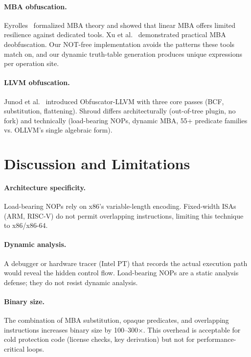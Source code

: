 \documentclass[letterpaper,twocolumn,10pt]{article}
\begin{document}
\paragraph{MBA obfuscation.} Eyrolles~\cite{eyrolles17} formalized MBA theory and showed that linear MBA offers limited resilience against dedicated tools. Xu et al.~\cite{xu23} demonstrated practical MBA deobfuscation. Our NOT-free implementation avoids the patterns these tools match on, and our dynamic truth-table generation produces unique expressions per operation site.

\paragraph{LLVM obfuscation.} Junod et al.~\cite{junod15} introduced Obfuscator-LLVM with three core passes (BCF, substitution, flattening). Shroud differs architecturally (out-of-tree plugin, no fork) and technically (load-bearing NOPs, dynamic MBA, 55+ predicate families vs. OLLVM's single algebraic form).

\section{Discussion and Limitations}

\paragraph{Architecture specificity.} Load-bearing NOPs rely on x86's variable-length encoding. Fixed-width ISAs (ARM, RISC-V) do not permit overlapping instructions, limiting this technique to x86/x86-64.

\paragraph{Dynamic analysis.} A debugger or hardware tracer (Intel PT) that records the actual execution path would reveal the hidden control flow. Load-bearing NOPs are a static analysis defense; they do not resist dynamic analysis.

\paragraph{Binary size.} The combination of MBA substitution, opaque predicates, and overlapping instructions increases binary size by 100--300$\times$. This overhead is acceptable for cold protection code (license checks, key derivation) but not for performance-critical loops.
\end{document}
